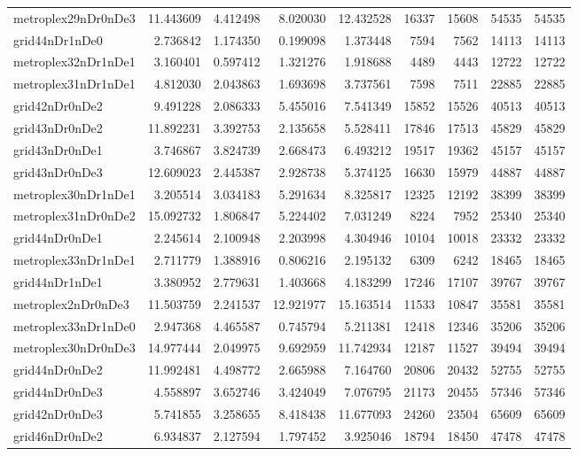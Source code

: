 \begin{longtable}{|l|r|r|r|r|r|r|r|r|}
metroplex29nDr0nDe3 & 11.443609 & 4.412498 & 8.020030 & 12.432528 & 16337 & 15608 & 54535 & 54535 \\
grid44nDr1nDe0 & 2.736842 & 1.174350 & 0.199098 & 1.373448 & 7594 & 7562 & 14113 & 14113 \\
metroplex32nDr1nDe1 & 3.160401 & 0.597412 & 1.321276 & 1.918688 & 4489 & 4443 & 12722 & 12722 \\
metroplex31nDr1nDe1 & 4.812030 & 2.043863 & 1.693698 & 3.737561 & 7598 & 7511 & 22885 & 22885 \\
grid42nDr0nDe2 & 9.491228 & 2.086333 & 5.455016 & 7.541349 & 15852 & 15526 & 40513 & 40513 \\
grid43nDr0nDe2 & 11.892231 & 3.392753 & 2.135658 & 5.528411 & 17846 & 17513 & 45829 & 45829 \\
grid43nDr0nDe1 & 3.746867 & 3.824739 & 2.668473 & 6.493212 & 19517 & 19362 & 45157 & 45157 \\
grid43nDr0nDe3 & 12.609023 & 2.445387 & 2.928738 & 5.374125 & 16630 & 15979 & 44887 & 44887 \\
metroplex30nDr1nDe1 & 3.205514 & 3.034183 & 5.291634 & 8.325817 & 12325 & 12192 & 38399 & 38399 \\
metroplex31nDr0nDe2 & 15.092732 & 1.806847 & 5.224402 & 7.031249 & 8224 & 7952 & 25340 & 25340 \\
grid44nDr0nDe1 & 2.245614 & 2.100948 & 2.203998 & 4.304946 & 10104 & 10018 & 23332 & 23332 \\
metroplex33nDr1nDe1 & 2.711779 & 1.388916 & 0.806216 & 2.195132 & 6309 & 6242 & 18465 & 18465 \\
grid44nDr1nDe1 & 3.380952 & 2.779631 & 1.403668 & 4.183299 & 17246 & 17107 & 39767 & 39767 \\
metroplex2nDr0nDe3 & 11.503759 & 2.241537 & 12.921977 & 15.163514 & 11533 & 10847 & 35581 & 35581 \\
metroplex33nDr1nDe0 & 2.947368 & 4.465587 & 0.745794 & 5.211381 & 12418 & 12346 & 35206 & 35206 \\
metroplex30nDr0nDe3 & 14.977444 & 2.049975 & 9.692959 & 11.742934 & 12187 & 11527 & 39494 & 39494 \\
grid44nDr0nDe2 & 11.992481 & 4.498772 & 2.665988 & 7.164760 & 20806 & 20432 & 52755 & 52755 \\
grid44nDr0nDe3 & 4.558897 & 3.652746 & 3.424049 & 7.076795 & 21173 & 20455 & 57346 & 57346 \\
grid42nDr0nDe3 & 5.741855 & 3.258655 & 8.418438 & 11.677093 & 24260 & 23504 & 65609 & 65609 \\
grid46nDr0nDe2 & 6.934837 & 2.127594 & 1.797452 & 3.925046 & 18794 & 18450 & 47478 & 47478 \\

\end{longtable}
